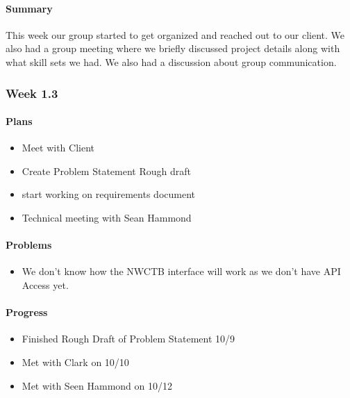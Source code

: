\documentclass[onecolumn, draftclsnofoot,10pt, compsoc]{article}
\begin{document}
		    \paragraph{Summary} \hfill \break
		         This week our group started to get organized and reached out to our client. We also had a group meeting where we briefly discussed project details along with what skill sets we had. We also had a discussion about group communication.\\
		         
		\subsubsection{Week 1.3}
		
		    \paragraph{Plans} \hfill \break
		        
		        \begin{itemize}
		            \item Meet with Client
		            \item Create Problem Statement Rough draft
		            \item start working on requirements document
		            \item Technical meeting with Sean Hammond
		        \end{itemize}
		        
		    \paragraph{Problems} \hfill \break
		    
		    \begin{itemize}
		        \item We don't know how the NWCTB interface will work as we don't have API Access yet.
		    \end{itemize}
		
		    \paragraph{Progress} \hfill \break

		    \begin{itemize}
		        \item Finished Rough Draft of Problem Statement 10/9
		        \item Met with Clark on 10/10
		        \item Met with Seen Hammond on 10/12
		    \end{itemize}
		    
\end{document}
